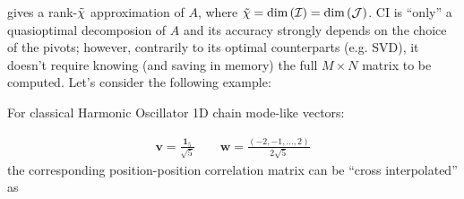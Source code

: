  gives a rank-${\tilde \chi}$ approximation of $A$, where ${\tilde \chi} = \text{dim}\left( \mathcal{I} \right) = \text{dim}\left( \mathcal{J} \right)$. CI is ``only'' a quasioptimal decomposion of $A$ and its accuracy strongly depends on the choice of the pivots; however, contrarily to its optimal counterparts (e.g. SVD), it doesn't require knowing (and saving in memory) the full $M \times N$ matrix to be computed. Let's consider the following example: 
\begin{example}
\label{ex:CIcorrmat}
For classical Harmonic Oscillator 1D chain mode-like vectors: 

\[
\begin{alignedat}{2}      
	\boldsymbol{v} = \frac{\boldsymbol{1}_5}{\sqrt{5}} \qquad \boldsymbol{w} = \frac{(-2,-1,\dots,2)}{2\sqrt{5}}
\end{alignedat}
\]
the corresponding position-position correlation matrix can be ``cross interpolated'' as 


\end{example}
